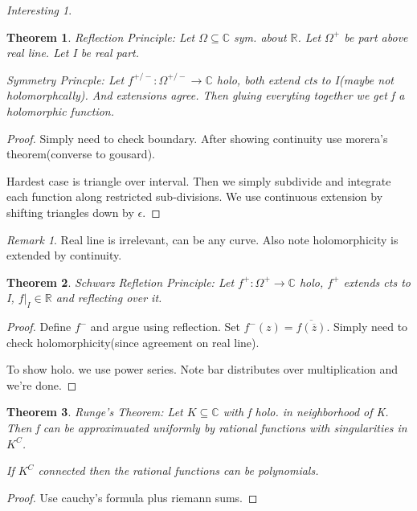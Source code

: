 \documentclass[11pt]{article}
\newcommand{\R}{\mathbb{R}}
\newcommand{\C}{\mathbb{C}}
\newtheorem{theorem}{Theorem}
\theoremstyle{remark}
\newtheorem{remark}{Remark}
\newtheorem{interest}{Interesting}
\begin{document}
\begin{interest}
\begin{theorem}
	\textit{Reflection Principle}: Let $\Omega \subseteq \C$ sym. about $\R$. Let $\Omega^+$ be part above real line. Let I be real part. 

	\textit{Symmetry Princple:} Let $f^{+/-}: \Omega^{+/-} \to \mathbb{C}$ holo, both extend cts to I(maybe not holomorphcally). And extensions agree. Then gluing everyting together we get f a holomorphic function. 

	
\end{theorem}

\begin{proof}
	Simply need to check boundary. After showing continuity use morera's theorem(converse to gousard). 

	Hardest case is triangle over interval. Then we simply subdivide and integrate each function along restricted sub-divisions. We use continuous extension by shifting triangles down by $\epsilon$. 
\end{proof}

\begin{remark}
	Real line is irrelevant, can be any curve. Also note holomorphicity is extended by continuity.
\end{remark}

\begin{theorem}
	Schwarz Refletion Principle: Let $f^+: \Omega^+ \to \mathbb{C}$ holo, $f^+$ extends cts to I, $f|_I \in \mathbb{R}$ and reflecting over it.
\end{theorem}

\begin{proof}
	Define $f^-$ and argue using reflection. Set $f^-(z) = \overline{f(\overline{z})}$. Simply need to check holomorphicity(since agreement on real line). 

	To show holo. we use power series. Note bar distributes over multiplication and we're done.
\end{proof}
	
\begin{theorem}
	\textit{Runge's Theorem}: Let $K \subseteq \mathbb{C}$ with f holo. in neighborhood of K. Then f can be approximuated uniformly by rational functions with singularities in $K^C$. 

	If $K^C$ connected then the rational functions can be polynomials. 
\end{theorem}

\begin{proof}
	Use cauchy's formula plus riemann sums. 


\end{proof}
\end{interest}
\end{document}
